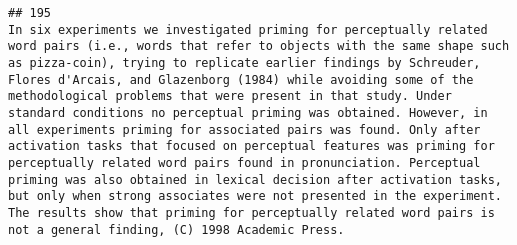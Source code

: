 \documentclass[
  english,
  man]{apa6}
\begin{document}
\begin{verbatim}
## 195                                                                                                                                                                                                                                                                                                                                                                                                                                                                                                                                                                                                                                                                                                                                                                                                                                                                                                                                                                                                                                                                                                                                                                                                                                                                                                                                                                                                                                                                                                                                                                                                                                                                                                                                                                           In six experiments we investigated priming for perceptually related word pairs (i.e., words that refer to objects with the same shape such as pizza-coin), trying to replicate earlier findings by Schreuder, Flores d'Arcais, and Glazenborg (1984) while avoiding some of the methodological problems that were present in that study. Under standard conditions no perceptual priming was obtained. However, in all experiments priming for associated pairs was found. Only after activation tasks that focused on perceptual features was priming for perceptually related word pairs found in pronunciation. Perceptual priming was also obtained in lexical decision after activation tasks, but only when strong associates were not presented in the experiment. The results show that priming for perceptually related word pairs is not a general finding, (C) 1998 Academic Press.

\end{verbatim}
\end{document}
